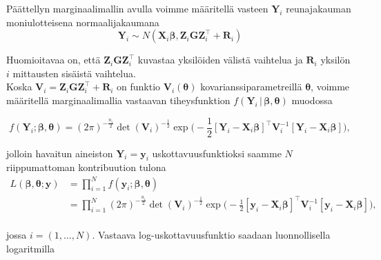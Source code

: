 \documentclass[finnish]{docopts}
\begin{document}
Päättellyn marginaalimallin avulla voimme määritellä vasteen $\bm{Y}_i$ reunajakauman moniulotteisena normaalijakaumana \\

$$
\bm{Y}_i \sim N(\bm{X}_i \bm{\beta}, \bm{Z}_i \bm{G} \bm{Z}^\top_i + \bm{R}_i)
$$

Huomioitavaa on, että $\bm{Z}_i \bm{G} \bm{Z}^\top_i$ kuvastaa yksilöiden välistä vaihtelua ja $\bm{R}_i$ yksilön $i$ mittausten sisäistä vaihtelua. \\

Koska $\bm{V}_i = \bm{Z}_i \bm{G} \bm{Z}^\top_i + \bm{R}_i$ on funktio $\bm{V}_i(\bm{\theta})$ kovarianssiparametreillä $\bm{\theta}$, voimme määritellä marginaalimallia vastaavan tiheysfunktion $f(\bm{Y}_i \, | \, \bm{\beta}, \bm{\theta})$ muodossa 

$$
f(\bm{Y}_i;\bm{\beta}, \bm{\theta}) = (2\pi)^{-\frac{n_i}{2}} \det (\bm{V}_i)^{-\frac{1}{2}} \exp \big( -\frac{1}{2} [\bm{Y}_i - \bm{X}_i \bm{\beta}]^\top \bm{V}_i^{-1} [\bm{Y}_i - \bm{X}_i \bm{\beta}]\big),
$$

jolloin havaitun aineiston $\bm{Y}_i = \bm{y}_i$ uskottavuusfunktioksi saamme $N$ riippumattoman kontribuution tulona \\

$$
\begin{aligned}
L(\bm{\beta}, \bm{\theta};\bm{y}) &= \prod_{i=1}^{N} f(\bm{y}_i;\bm{\beta}, \bm{\theta}) \\
&= \prod_{i=1}^{N} (2\pi)^{-\frac{n_i}{2}} \det (\bm{V}_i)^{-\frac{1}{2}} \exp \big( -\frac{1}{2} [\bm{y}_i - \bm{X}_i \bm{\beta}]^\top \bm{V}_i^{-1} [\bm{y}_i - \bm{X}_i \bm{\beta}]\big), \\
\end{aligned}
$$

jossa $i = (1,\dots, N)$. Vastaava log-uskottavuusfunktio saadaan luonnollisella logaritmilla
\end{document}
